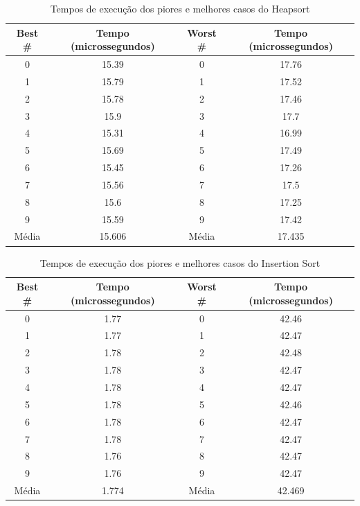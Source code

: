 \documentclass[10pt,a4paper]{article}
\begin{document}
\begin{center}
\begin{table}
\begin{tabular}{| c | c | c | c |}
\hline
Best \# & Tempo (microssegundos) & Worst \# & Tempo (microssegundos) \\ \hline 
0 & 15.39 & 0 & 17.76 \\ \hline 
1 & 15.79 & 1 & 17.52 \\ \hline 
2 & 15.78 & 2 & 17.46 \\ \hline 
3 & 15.9 & 3 & 17.7 \\ \hline 
4 & 15.31 & 4 & 16.99 \\ \hline 
5 & 15.69 & 5 & 17.49 \\ \hline 
6 & 15.45 & 6 & 17.26 \\ \hline 
7 & 15.56 & 7 & 17.5 \\ \hline 
8 & 15.6 & 8 & 17.25 \\ \hline 
9 & 15.59 & 9 & 17.42 \\ \hline 
Média & 15.606 & Média & 17.435 \\ \hline 
\end{tabular}
\caption{Tempos de execução dos piores e melhores casos do Heapsort}
\label{table:heap_worst_best}
\end{table}
\end{center}


\begin{center}
\begin{table}
\begin{tabular}{| c | c | c | c |}
\hline
Best \# & Tempo (microssegundos) & Worst \# & Tempo (microssegundos) \\ \hline 
0 & 1.77 & 0 & 42.46 \\ \hline 
1 & 1.77 & 1 & 42.47 \\ \hline 
2 & 1.78 & 2 & 42.48 \\ \hline 
3 & 1.78 & 3 & 42.47 \\ \hline 
4 & 1.78 & 4 & 42.47 \\ \hline 
5 & 1.78 & 5 & 42.46 \\ \hline 
6 & 1.78 & 6 & 42.47 \\ \hline 
7 & 1.78 & 7 & 42.47 \\ \hline 
8 & 1.76 & 8 & 42.47 \\ \hline 
9 & 1.76 & 9 & 42.47 \\ \hline 
Média & 1.774 & Média & 42.469 \\ \hline 
\end{tabular}
\caption{Tempos de execução dos piores e melhores casos do Insertion Sort}
\label{table:insertion_worst_best}
\end{table}
\end{center}
\end{document}
